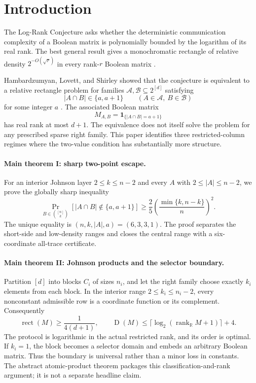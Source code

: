 \documentclass[11pt]{article}
\theoremstyle{definition}
\theoremstyle{remark}
\newcommand{\cA}{\mathcal A}
\newcommand{\cB}{\mathcal B}
\newcommand{\R}{\mathbb R}
\newcommand{\1}{\mathbf 1}
\newcommand{\rank}{\operatorname{rank}}
\newcommand{\rect}{\operatorname{rect}}
\newcommand{\Dcc}{\operatorname{D}}
\begin{document}
\section{Introduction}

The Log-Rank Conjecture asks whether the deterministic communication
complexity of a Boolean matrix is polynomially bounded by the logarithm of
its real rank.  The best general result gives a monochromatic rectangle of
relative density \(2^{-O(\sqrt r)}\) in every rank-\(r\) Boolean matrix
\cite{SudakovTomon,HambardzumyanLovettShirley}.

Hambardzumyan, Lovett, and Shirley showed that the conjecture is equivalent
to a relative rectangle problem for families
\(\cA,\cB\subseteq2^{[d]}\) satisfying
\begin{equation}\label{eq:two-level}
 |A\cap B|\in\{a,a+1\}
 \qquad(A\in\cA,\ B\in\cB)
\end{equation}
for some integer \(a\) \cite{HambardzumyanLovettShirley}.  The associated
Boolean matrix
\begin{equation}\label{eq:matrix}
 M_{A,B}=\1_{\{|A\cap B|=a+1\}}
\end{equation}
has real rank at most \(d+1\).  The equivalence does not itself solve the
problem for any prescribed sparse right family.  This paper identifies three
restricted-column regimes where the two-value condition has substantially
more structure.

\paragraph{Main theorem I: sharp two-point escape.}
For an interior Johnson layer \(2\le k\le n-2\) and every
\(A\) with \(2\le|A|\le n-2\), we prove the globally sharp inequality
\[
 \Pr_{B\in\binom{[n]}k}[|A\cap B|\notin\{a,a+1\}]
 \ge\frac25\left(\frac{\min\{k,n-k\}}n\right)^2.
\]
The unique equality is
\((n,k,|A|,a)=(6,3,3,1)\).  The proof separates the short-side and
low-density ranges and closes the central range with a six-coordinate
all-trace certificate.

\paragraph{Main theorem II: Johnson products and the selector boundary.}
Partition \([d]\) into blocks \(C_i\) of sizes \(n_i\), and let the right
family choose exactly \(k_i\) elements from each block.  In the interior
range \(2\le k_i\le n_i-2\), every nonconstant admissible row is a coordinate
function or its complement.  Consequently
\[
 \rect(M)\ge\frac1{4(d+1)},\qquad
 \Dcc(M)\le\lceil\log_2(\rank_{\R}M+1)\rceil+4.
\]
The protocol is logarithmic in the actual restricted rank, and its order is
optimal.  If \(k_i=1\), the block becomes a selector domain and embeds an
arbitrary Boolean matrix.  Thus the boundary is universal rather than a
minor loss in constants.  The abstract atomic-product theorem packages this
classification-and-rank argument; it is not a separate headline claim.
\end{document}
